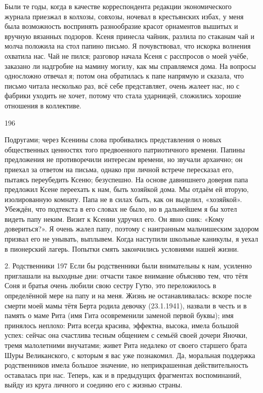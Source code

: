 Были те годы, когда в качестве корреспондента редакции экономического журнала приезжал в колхозы, совхозы, ночевал в крестьянских избах, у меня была возможность воспринять разнообразие красот орнаментов вышитых и вручную вязанных подзоров. Ксеня принесла чайник, разлила по стаканам чай и молча положила на стол папино письмо. Я почувствовал, что искорка волнения охватила нас. Чай не пился; разговор начала Ксеня с расспросов о моей учёбе, заказано ли надгробие на мамину могилу, как мы справляемся дома. На вопросы односложно отвечал я; потом она обратилась к папе напрямую и сказала, что письмо читала несколько раз, всё себе представляет, очень жалеет нас, но с фабрики уходить не хочет, потому что стала ударницей, сложились хорошие отношения в коллективе.

196

Подругами; через Ксенины слова пробивались представления о новых общественных ценностях того предвоенного патриотичного времени. Папины предложения не противоречили интересам времени, но звучали архаично; он приехал за ответом на письма, однако при личной встрече пересказал его, пытаясь переубедить Ксеню; безуспешно. На основе давнишнего доверия папа предложил Ксене переехать к нам, быть хозяйкой дома. Мы отдаём ей вторую, изолированную комнату. Папа не в силах быть, как он выделил, «хозяйкой». Убеждён, что подтекста в его словах не было, но в дальнейшем я бы хотел видеть папу неким. Визит к Ксении удручил его. Он явно сник: «Кому довериться?». Я очень жалел папу, поэтому с наигранным мальчишеским задором призвал его не унывать, выплывем. Когда наступили школьные каникулы, я уехал в пионерский лагерь. Попытки смять закончились условиями нашей жизни.

2. Родственники
197 Если бы родственники были внимательны к нам, усиленно приглашали на выходные дни: отчасти такое внимание объясняю тем, что тётя Соня и братья очень любили свою сестру Гутю, это переложилось в определённой мере на папу и на меня. Жизнь не останавливалась: вскоре после смерти моей мамы тётя Берта родила девочку (23.1.1941), назвали в честь и в память о маме Рита (имя Гита осовременили заменой первой буквы); имя принялось неплохо: Рита всегда красива, эффектна, высока, имела большой успех: сейчас она счастлива тесным общением с семьёй своей дочери Яночки, тремя малолетними внучатами; живет Рита недалеко от своего старшего брата Шуры Великанского, с которым я вас уже познакомил. Да, моральная поддержка родственников имела большое значение, но неприкрашенная действительность оставалась при нас.
Теперь, как и в предыдущих фрагментах воспоминаний, выйду из круга личного и соединю его с жизнью страны.

